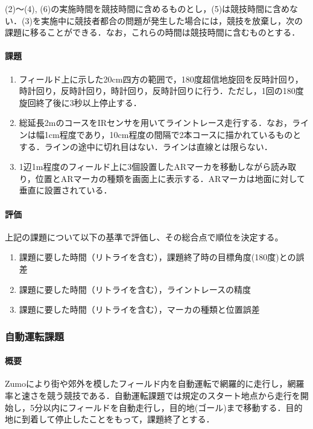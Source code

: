 \documentclass[submit]{ipsj}
\begin{document}
(2)〜(4), (6)の実施時間を競技時間に含めるものとし，(5)は競技時間に含めない．(3)を実施中に競技者都合の問題が発生した場合には，競技を放棄し，次の課題に移ることができる．なお，これらの時間は競技時間に含むものとする．

\paragraph*{課題}
\begin{enumerate}
\item フィールド上に示した20cm四方の範囲で，180度超信地旋回を反時計回り，時計回り，反時計回り，時計回り，反時計回りに行う．ただし，1回の180度旋回終了後に3秒以上停止する．
\item 総延長2mのコースをIRセンサを用いてライントレース走行する．なお，ラインは幅1cm程度であり，10cm程度の間隔で2本コースに描かれているものとする．ラインの途中に切れ目はない．ラインは直線とは限らない．
\item 1辺1m程度のフィールド上に3個設置したARマーカを移動しながら読み取り，位置とARマーカの種類を画面上に表示する．ARマーカは地面に対して垂直に設置されている．
\end{enumerate}

\paragraph*{評価}
上記の課題について以下の基準で評価し、その総合点で順位を決定する。
\begin{enumerate}
\item 課題に要した時間（リトライを含む），課題終了時の目標角度(180度)との誤差
\item 課題に要した時間（リトライを含む），ライントレースの精度
\item 課題に要した時間（リトライを含む），マーカの種類と位置誤差
\end{enumerate}

\subsubsection{自動運転課題}
\paragraph*{概要}

Zumoにより街や郊外を模したフィールド内を自動運転で網羅的に走行し，網羅率と速さを競う競技である．自動運転課題では規定のスタート地点から走行を開始し，5分以内にフィールドを自動走行し，目的地(ゴール)まで移動する．目的地に到着して停止したことをもって，課題終了とする．
\end{document}
